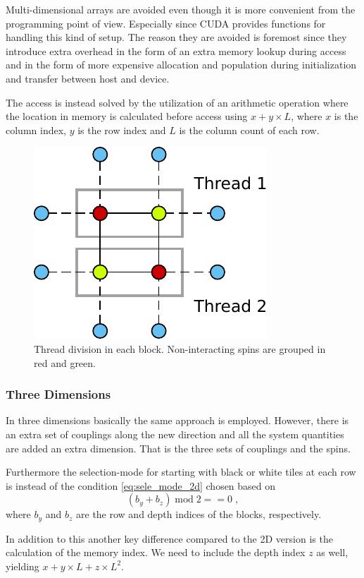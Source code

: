 \documentclass[paper=a4, fontsize=11pt]{scrartcl} %
\numberwithin{equation}{section} %
\numberwithin{figure}{section} %
\numberwithin{table}{section} %
\begin{document}
Multi-dimensional arrays are avoided even though it is more convenient from the programming point of view. Especially since CUDA provides functions for handling this kind of setup. The reason they are avoided is foremost since they introduce extra overhead in the form of an extra memory lookup during access and in the form of more expensive allocation and population during initialization and transfer between host and device.

The access is instead solved by the utilization of an arithmetic operation where the location in memory is calculated before access using $x + y \times L$, where $x$ is the column index, $y$ is the row index and $L$ is the column count of each row.

\begin{figure}
\centering
\includegraphics[width=.4\linewidth]{images/2D_threads.pdf}
\caption{Thread division in each block. Non-interacting spins are grouped in red and green.}
\label{fig:2D_threads}
\end{figure}


\subsubsection{Three Dimensions}
In three dimensions basically the same approach is employed. However, there is an extra set of couplings along the new direction and all the system quantities are added an extra dimension. That is the three sets of couplings and the spins. 

Furthermore the selection-mode for starting with black or white tiles at each row is instead of the condition \ref{eq:sele_mode_2d} chosen based on
\begin{equation}
(b_y + b_z)\; \text{mod} \; 2 == 0 \;,
\end{equation}
where $b_y$ and $b_z$ are the row and depth indices of the blocks, respectively. 

In addition to this another key difference compared to the 2D version is the calculation of the memory index. We need to include the depth index $z$ as well, yielding $x + y \times L + z \times L^2$.
\end{document}
